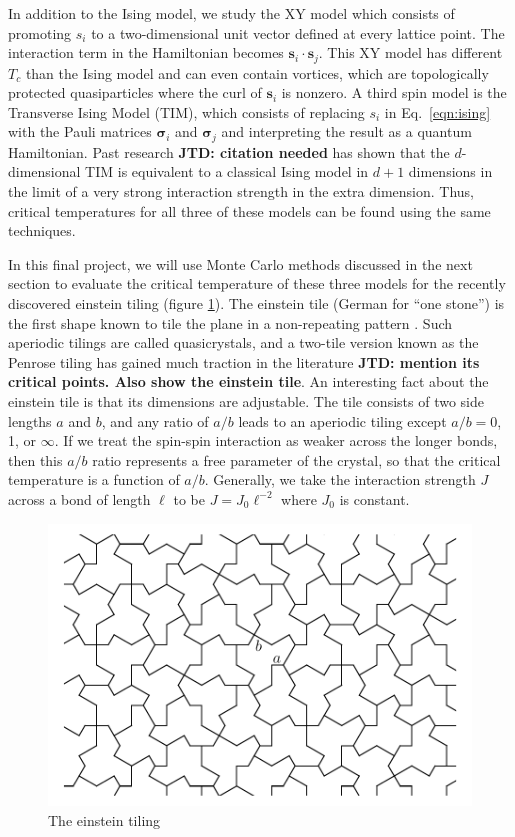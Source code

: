 \documentclass[amsmath,amssymb,aps,twocolumn,nofootinbib]{revtex4-2}
\newcommand{\jtd}[1]{{\color{red}\textbf{JTD: #1}}}
\begin{document}
In addition to the Ising model, we study the XY model which consists of promoting $s_i$ to a two-dimensional unit vector defined at every lattice point. The interaction term in the Hamiltonian becomes $\bm s_i \cdot \bm s_j$. This XY model has different $T_c$ than the Ising model and can even contain vortices, which are topologically protected quasiparticles where the curl of $\bm s_i$ is nonzero. A third spin model is the Transverse Ising Model (TIM), which consists of replacing $s_i$ in Eq.~\ref{eqn:ising} with the Pauli matrices $\bm \sigma_i$ and $\bm \sigma_j$ and interpreting the result as a quantum Hamiltonian. Past research \jtd{citation needed} has shown that the $d$-dimensional TIM is equivalent to a classical Ising model in $d+1$ dimensions in the limit of a very strong interaction strength in the extra dimension. Thus, critical temperatures for all three of these models can be found using the same techniques.

In this final project, we will use Monte Carlo methods discussed in the next section to evaluate the critical temperature of these three models for the recently discovered einstein tiling (figure \ref{fig:einstein}). The einstein tile (German for ``one stone'') is the first shape known to tile the plane in a non-repeating pattern \cite{smith2023aperiodic}. Such aperiodic tilings are called quasicrystals, and a two-tile version known as the Penrose tiling has gained much traction in the literature \jtd{mention its critical points. Also show the einstein tile}. An interesting fact about the einstein tile is that its dimensions are adjustable. The tile consists of two side lengths $a$ and $b$, and any ratio of $a/b$ leads to an aperiodic tiling except $a/b=0$, 1, or $\infty$. If we treat the spin-spin interaction as weaker across the longer bonds, then this $a/b$ ratio represents a free parameter of the crystal, so that the critical temperature is a function of $a/b$. Generally, we take the interaction strength $J$ across a bond of length $\ell$ to be $J = J_0 \ell^{-2}$ where $J_0$ is constant.

\begin{figure}
  \centering
  \includegraphics[width=\linewidth]{../figs/einstein.pdf}
  \caption{The einstein tiling}
  \label{fig:einstein}
\end{figure}
\end{document}
